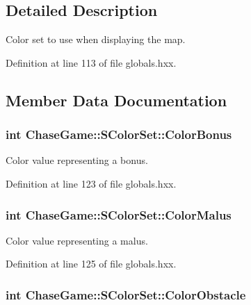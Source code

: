 \subsection{Detailed Description}
Color set to use when displaying the map. 

Definition at line 113 of file globals.\-hxx.



\subsection{Member Data Documentation}
\hypertarget{struct_chase_game_1_1_s_color_set_aacd34496b36640358ecae127f6bb6cc4}{
\subsubsection[{Color\-Bonus}]{\setlength{\rightskip}{0pt plus 5cm}int Chase\-Game\-::\-S\-Color\-Set\-::\-Color\-Bonus}}\label{struct_chase_game_1_1_s_color_set_aacd34496b36640358ecae127f6bb6cc4}


Color value representing a bonus. 



Definition at line 123 of file globals.\-hxx.

\hypertarget{struct_chase_game_1_1_s_color_set_aa2eb52b7d1fb4059da9935a230715498}{
\subsubsection[{Color\-Malus}]{\setlength{\rightskip}{0pt plus 5cm}int Chase\-Game\-::\-S\-Color\-Set\-::\-Color\-Malus}}\label{struct_chase_game_1_1_s_color_set_aa2eb52b7d1fb4059da9935a230715498}


Color value representing a malus. 



Definition at line 125 of file globals.\-hxx.

\hypertarget{struct_chase_game_1_1_s_color_set_acb1e4df5c042ae8ca8a66d7de26a9148}{
\subsubsection[{Color\-Obstacle}]{\setlength{\rightskip}{0pt plus 5cm}int Chase\-Game\-::\-S\-Color\-Set\-::\-Color\-Obstacle}}\label{struct_chase_game_1_1_s_color_set_acb1e4df5c042ae8ca8a66d7de26a9148}


